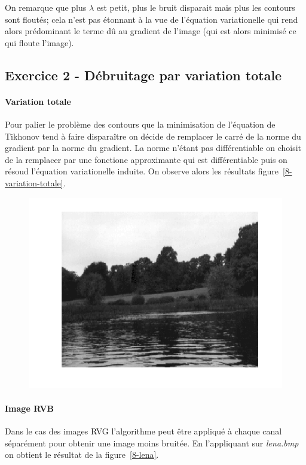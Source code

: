 \documentclass{article}
\begin{document}
On remarque que plus $\lambda$ est petit, plus le bruit disparait mais plus les contours sont floutés; cela n'est pas étonnant à la vue de l'équation variationelle qui rend alors prédominant le terme dû au gradient de l'image (qui est alors minimisé ce qui floute l'image).

\subsection{Exercice 2 - Débruitage par variation totale}
\paragraph{Variation totale}
Pour palier le problème des contours que la minimisation de l'équation de Tikhonov tend à faire disparaître on décide de remplacer le carré de la norme du gradient par la norme du gradient. La norme n'étant pas différentiable on choisit de la remplacer par une fonctione approximante qui est différentiable puis on résoud l'équation variationelle induite. On observe alors les résultats figure~\ref{8-variation-totale}.

\begin{figure}[!ht]
\includegraphics[width=\textwidth]{images/1/1-1-autumn_b.png}
\end{figure}

\paragraph{Image RVB}
Dans le cas des images RVG l'algorithme peut être appliqué à chaque canal séparément pour obtenir une image moins bruitée. En l'appliquant sur \emph{lena.bmp} on obtient le résultat de la figure~\ref{8-lena}.
\end{document}
